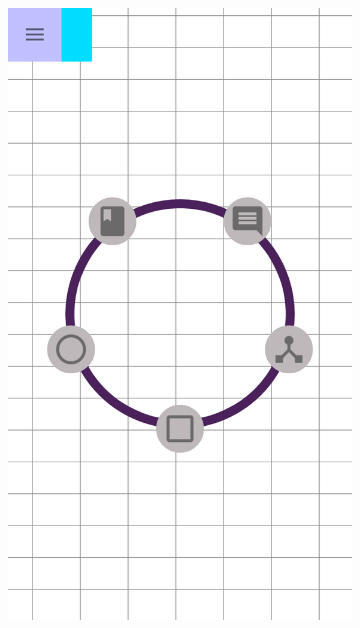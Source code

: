 \begin{itemize}
\newpage
		\begin{figure}[!h]
			\centering
			\begin{subfigure}[t]{.27\textwidth}
				\includegraphics[width=\textwidth]{img/screen/colladia_draw_view_menu_contextuel_main}
			\end{subfigure}
			~
			\begin{subfigure}[t]{.27\textwidth}

\end{subfigure}
\end{figure}
\end{itemize}
